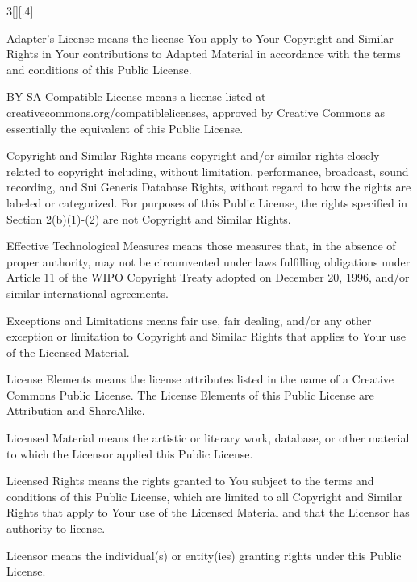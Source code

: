 \documentclass[8pt,cleardoubleempty]{scrbook}
\begin{document}
\begin{multicols}{3}[][.4\paperwidth]
\begin{longenum}
\begin{longenum}
  \item Adapter's License means the license You apply to Your Copyright
     and Similar Rights in Your contributions to Adapted Material in
     accordance with the terms and conditions of this Public License.

  \item BY-SA Compatible License means a license listed at
     creativecommons.org/compatiblelicenses, approved by Creative
     Commons as essentially the equivalent of this Public License.

  \item Copyright and Similar Rights means copyright and/or similar rights
     closely related to copyright including, without limitation,
     performance, broadcast, sound recording, and Sui Generis Database
     Rights, without regard to how the rights are labeled or
     categorized. For purposes of this Public License, the rights
     specified in Section 2(b)(1)-(2) are not Copyright and Similar
     Rights.

  \item Effective Technological Measures means those measures that, in the
     absence of proper authority, may not be circumvented under laws
     fulfilling obligations under Article 11 of the WIPO Copyright
     Treaty adopted on December 20, 1996, and/or similar international
     agreements.

  \item Exceptions and Limitations means fair use, fair dealing, and/or
     any other exception or limitation to Copyright and Similar Rights
     that applies to Your use of the Licensed Material.

  \item License Elements means the license attributes listed in the name
     of a Creative Commons Public License. The License Elements of this
     Public License are Attribution and ShareAlike.

  \item Licensed Material means the artistic or literary work, database,
     or other material to which the Licensor applied this Public
     License.

  \item Licensed Rights means the rights granted to You subject to the
     terms and conditions of this Public License, which are limited to
     all Copyright and Similar Rights that apply to Your use of the
     Licensed Material and that the Licensor has authority to license.

  \item Licensor means the individual(s) or entity(ies) granting rights
     under this Public License.


\end{longenum}
\end{longenum}
\end{multicols}
\end{document}
